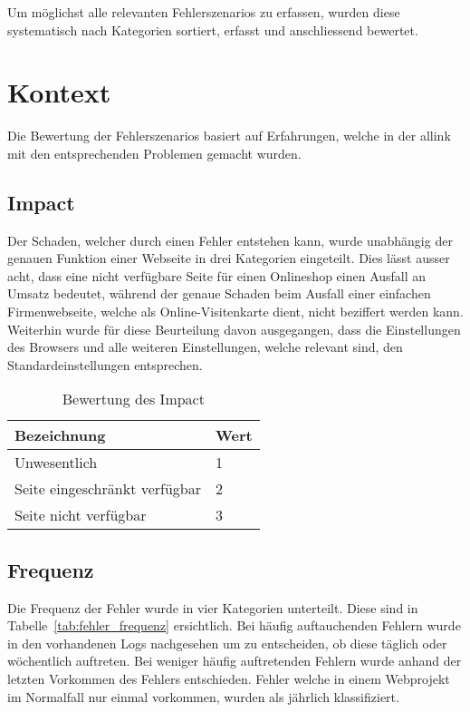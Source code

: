 
Um möglichst alle relevanten Fehlerszenarios zu erfassen, wurden diese systematisch nach Kategorien sortiert, erfasst und anschliessend bewertet.

\section{Kontext}
\label{sec:kontext}
Die Bewertung der Fehlerszenarios basiert auf Erfahrungen, welche in der allink mit den entsprechenden Problemen gemacht wurden.

\makeatletter
{} \setcounter{fnumber}{0}
\renewcommand\thefnumber{F\arabic{fnumber}}
\newcommand{\newfnumber}[5]%
{%
\midrule%
\refstepcounter{fnumber}%
\expandafter\xdef\csname f#2\endcsname {#1}%
\thefnumber\label{f:#2} & #1 & #3 & #4 & #5 \\
}
\makeatother

\subsection{Impact}
\label{sub:impact}
Der Schaden, welcher durch einen Fehler entstehen kann, wurde unabhängig der genauen Funktion einer Webseite in drei Kategorien eingeteilt. Dies lässt ausser acht, dass eine nicht verfügbare Seite für einen Onlineshop einen Ausfall an Umsatz bedeutet, während der genaue Schaden beim Ausfall einer einfachen Firmenwebseite, welche als Online-Visitenkarte dient, nicht beziffert werden kann. Weiterhin wurde für diese Beurteilung davon ausgegangen, dass die Einstellungen des Browsers und alle weiteren Einstellungen, welche relevant sind, den Standardeinstellungen entsprechen.

\begin{table}[h!]
  \centering
  \begin{tabular}{ll}
  \toprule
    \textbf{Bezeichnung} & \textbf{Wert}\\
  \hline
    Unwesentlich & 1\\
  \hline
    Seite eingeschränkt verfügbar & 2\\
  \hline
    Seite nicht verfügbar & 3\\
  \bottomrule
  \end{tabular}
  \caption{Bewertung des Impact}
  \label{tab:impact}
\end{table}

\subsection{Frequenz}
\label{sub:frequenz}
Die Frequenz der Fehler wurde in vier Kategorien unterteilt. Diese sind in Tabelle~\ref{tab:fehler_frequenz} ersichtlich. Bei häufig auftauchenden Fehlern wurde in den vorhandenen Logs nachgesehen um zu entscheiden, ob diese täglich oder wöchentlich auftreten. Bei weniger häufig auftretenden Fehlern wurde anhand der letzten Vorkommen des Fehlers entschieden. Fehler welche in einem Webprojekt im Normalfall nur einmal vorkommen, wurden als jährlich klassifiziert.

